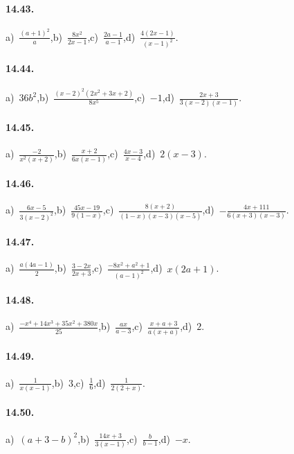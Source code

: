 \paragraph{14.43.}
a)~$\frac{(a+1)^{2}}{a}$,\quad b)~$\frac{8x^{2}}{2x-1}$,\quad c)~$\frac{2a-1}{a-1}$,\quad d)~$\frac{4(2x-1)}{(x-1)^{2}}$.

\paragraph{14.44.}
a)~$36b^{2}$,\quad b)~$\frac{(x-2)^{2}(2x^{2}+3x+2)}{8x^{5}}$,\quad c)~$-1$,\quad d)~$\frac{2x+3}{3(x-2)(x-1)}$.

\paragraph{14.45.}
a)~$\frac{-2}{x^{2}(x+2)}$,\quad b)~$\frac{x+2}{6x(x-1)}$,\quad c)~$\frac{4x-3}{x-4}$,\quad d)~$2(x-3)$.

\paragraph{14.46.}
a)~$\frac{6x-5}{3(x-2)^{2}}$,\quad b)~$\frac{45x-19}{9(1-x)}$,\quad c)~$\frac{8(x+2)}{(1-x)(x-3)(x-5)}$,\quad d)~$-\frac{4x+111}{6(x+3)(x-3)}$.

\paragraph{14.47.}
a)~$\frac{a(4a-1)}{2}$,\quad b)~$\frac{3-2x}{2x+3}$,\quad c)~$\frac{-8x^2+a^2+1}{(a-1)^2}$,\quad d)~$x(2a+1)$.

\paragraph{14.48.}
a)~$\frac{-x^4+14x^3+35x^2+380x}{25}$,\quad b)~$\frac{ax}{a-3}$,\quad c)~$\frac{x+a+3}{a(x+a)}$,\quad d)~$2$.

\paragraph{14.49.}
a)~$\frac{1}{x(x-1)}$,\quad b)~$3$,\quad c)~$\frac{1}{6}$,\quad d)~$\frac{1}{2(2+x)}$.

\paragraph{14.50.}
a)~$(a+3-b)^{2}$,\quad b)~$\frac{14x+3}{3(x-1)}$,\quad c)~$\frac{b}{b-1}$,\quad d)~$-x$.

